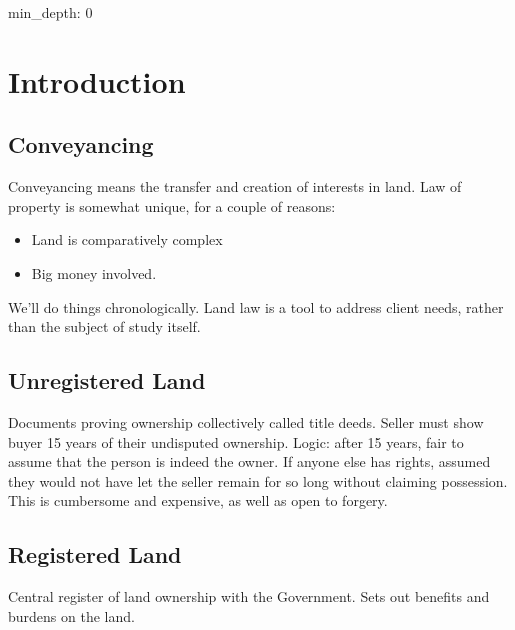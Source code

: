 \documentclass[
]{article}
\author{}
\date{}
\newenvironment{Shaded}{}{}
\newcommand{\NormalTok}[1]{#1}
\providecommand{\tightlist}{%
  \setlength{\itemsep}{0pt}\setlength{\parskip}{0pt}}
\begin{document}
{
\setcounter{tocdepth}{3}
\tableofcontents
}
\begin{Shaded}
\begin{Highlighting}[]
\NormalTok{min\_depth: 0}
\end{Highlighting}
\end{Shaded}

\hypertarget{introduction}{%
\section{Introduction}\label{introduction}}

\hypertarget{conveyancing}{%
\subsection{Conveyancing}\label{conveyancing}}

Conveyancing means the transfer and creation of interests in land. Law
of property is somewhat unique, for a couple of reasons:

\begin{itemize}
\tightlist
\item
  Land is comparatively complex
\item
  Big money involved.
\end{itemize}

We'll do things chronologically. Land law is a tool to address client
needs, rather than the subject of study itself.

\hypertarget{unregistered-land}{%
\subsection{Unregistered Land}\label{unregistered-land}}

Documents proving ownership collectively called title deeds. Seller must
show buyer 15 years of their undisputed ownership. Logic: after 15
years, fair to assume that the person is indeed the owner. If anyone
else has rights, assumed they would not have let the seller remain for
so long without claiming possession. This is cumbersome and expensive,
as well as open to forgery.

\hypertarget{registered-land}{%
\subsection{Registered Land}\label{registered-land}}

Central register of land ownership with the Government. Sets out
benefits and burdens on the land.
\end{document}
